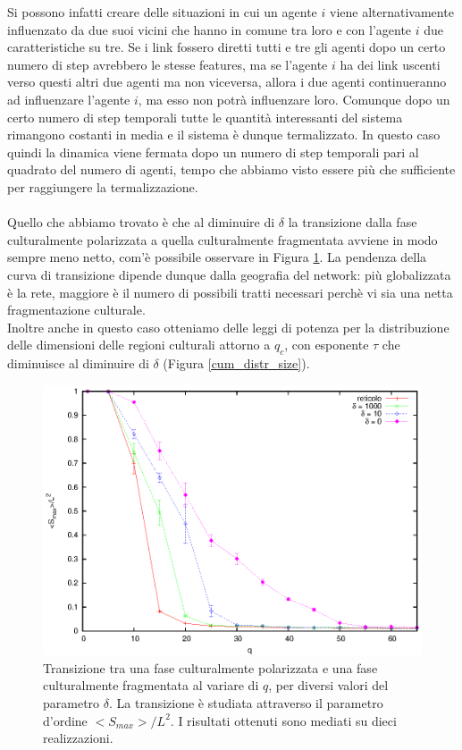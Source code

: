 \documentclass[a4paper,12pt]{article}
\begin{document}
Si possono infatti creare delle situazioni in cui un agente $i$ viene alternativamente influenzato da due suoi vicini che hanno in comune tra loro e con l'agente $i$ due caratteristiche su tre. Se i link fossero diretti tutti e tre gli agenti dopo un certo numero di step avrebbero le stesse features, ma se l'agente $i$ ha dei link uscenti verso questi altri due agenti ma non viceversa, allora i due agenti continueranno ad influenzare l'agente $i$, ma esso non potr\`{a} influenzare loro.
Comunque dopo un certo numero di step temporali tutte le quantit\`{a} interessanti del sistema rimangono costanti in media e il sistema \`{e} dunque termalizzato. In questo caso quindi la dinamica viene fermata dopo un numero di step temporali pari al quadrato del numero di agenti, tempo che abbiamo visto essere pi\`{u} che sufficiente per raggiungere la termalizzazione.
\\ \\Quello che abbiamo trovato \`{e} che al diminuire di $\delta$ la transizione dalla fase culturalmente polarizzata a quella culturalmente fragmentata avviene in modo sempre meno netto, com'\`{e} possibile osservare in Figura \ref{transiz}.
La pendenza della curva di transizione dipende dunque dalla geografia del network: pi\`{u} globalizzata \`{e} la rete, maggiore \`{e} il numero di possibili tratti necessari perch\`{e} vi sia una netta fragmentazione culturale.
\\Inoltre anche in questo caso otteniamo delle leggi di potenza per la distribuzione delle dimensioni delle regioni culturali attorno a $q_c$, con esponente $\tau$ che diminuisce al diminuire di $\delta$ (Figura \ref{cum_distr_size}).

\begin{figure}[!ht]
\begin{center}
\includegraphics[width=\textwidth]{transizione.eps}
\end{center}
\caption{Transizione tra una fase culturalmente polarizzata e una fase culturalmente fragmentata al variare di $q$, per diversi valori del parametro $\delta$. La transizione \`{e} studiata attraverso il parametro d'ordine $<S_{max}>/L^2$. I risultati ottenuti sono mediati su dieci realizzazioni.}
\label{transiz}
\end{figure}
\end{document}
